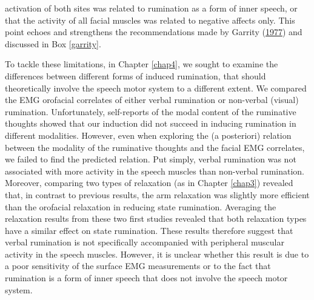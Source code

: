 \documentclass[a4paper,12pt,twoside,onecolumn,openright,final,oldfontcommands]{memoir}
\begin{document}
activation of both sites was related to rumination as a form of inner speech, or that the activity of all facial muscles was related to negative affects only. This point echoes and strengthens the recommendations made by Garrity (\protect\hyperlink{ref-garrity_electromyography_1977}{1977}) and discussed in Box \ref{garrity}.

To tackle these limitations, in Chapter \ref{chap4}, we sought to examine the differences between different forms of induced rumination, that should theoretically involve the speech motor system to a different extent. We compared the EMG orofacial correlates of either verbal rumination or non-verbal (visual) rumination. Unfortunately, self-reports of the modal content of the ruminative thoughts showed that our induction did not succeed in inducing rumination in different modalities. However, even when exploring the (a posteriori) relation between the modality of the ruminative thoughts and the facial EMG correlates, we failed to find the predicted relation. Put simply, verbal rumination was not associated with more activity in the speech muscles than non-verbal rumination. Moreover, comparing two types of relaxation (as in Chapter \ref{chap3}) revealed that, in contrast to previous results, the arm relaxation was slightly more efficient than the orofacial relaxation in reducing state rumination. Averaging the relaxation results from these two first studies revealed that both relaxation types have a similar effect on state rumination. These results therefore suggest that verbal rumination is not specifically accompanied with peripheral muscular activity in the speech muscles. However, it is unclear whether this result is due to a poor sensitivity of the surface EMG measurements or to the fact that rumination is a form of inner speech that does not involve the speech motor system.
\end{document}
